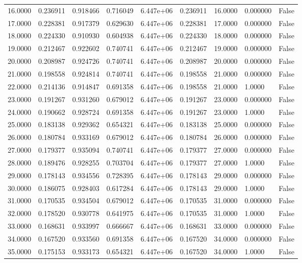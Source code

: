 \documentclass[11pt]{report}
\begin{document}
\begin{longtable}{lllllllll}
16.0000 & 0.236911 & 0.918466 & 0.716049 & 6.447e+06 & 0.236911 & 16.0000 & 0.000000 & False \\
17.0000 & 0.228381 & 0.917379 & 0.629630 & 6.447e+06 & 0.228381 & 17.0000 & 0.000000 & False \\
18.0000 & 0.224330 & 0.910930 & 0.604938 & 6.447e+06 & 0.224330 & 18.0000 & 0.000000 & False \\
19.0000 & 0.212467 & 0.922602 & 0.740741 & 6.447e+06 & 0.212467 & 19.0000 & 0.000000 & False \\
20.0000 & 0.208987 & 0.924726 & 0.740741 & 6.447e+06 & 0.208987 & 20.0000 & 0.000000 & False \\
21.0000 & 0.198558 & 0.924814 & 0.740741 & 6.447e+06 & 0.198558 & 21.0000 & 0.000000 & False \\
22.0000 & 0.214136 & 0.914847 & 0.691358 & 6.447e+06 & 0.198558 & 21.0000 & 1.0000 & False \\
23.0000 & 0.191267 & 0.931260 & 0.679012 & 6.447e+06 & 0.191267 & 23.0000 & 0.000000 & False \\
24.0000 & 0.190662 & 0.928724 & 0.691358 & 6.447e+06 & 0.191267 & 23.0000 & 1.0000 & False \\
25.0000 & 0.183138 & 0.929362 & 0.654321 & 6.447e+06 & 0.183138 & 25.0000 & 0.000000 & False \\
26.0000 & 0.180784 & 0.933169 & 0.679012 & 6.447e+06 & 0.180784 & 26.0000 & 0.000000 & False \\
27.0000 & 0.179377 & 0.935094 & 0.740741 & 6.447e+06 & 0.179377 & 27.0000 & 0.000000 & False \\
28.0000 & 0.189476 & 0.928255 & 0.703704 & 6.447e+06 & 0.179377 & 27.0000 & 1.0000 & False \\
29.0000 & 0.178143 & 0.934556 & 0.728395 & 6.447e+06 & 0.178143 & 29.0000 & 0.000000 & False \\
30.0000 & 0.186075 & 0.928403 & 0.617284 & 6.447e+06 & 0.178143 & 29.0000 & 1.0000 & False \\
31.0000 & 0.170535 & 0.934504 & 0.679012 & 6.447e+06 & 0.170535 & 31.0000 & 0.000000 & False \\
32.0000 & 0.178520 & 0.930778 & 0.641975 & 6.447e+06 & 0.170535 & 31.0000 & 1.0000 & False \\
33.0000 & 0.168631 & 0.933997 & 0.666667 & 6.447e+06 & 0.168631 & 33.0000 & 0.000000 & False \\
34.0000 & 0.167520 & 0.933560 & 0.691358 & 6.447e+06 & 0.167520 & 34.0000 & 0.000000 & False \\
35.0000 & 0.175153 & 0.933173 & 0.654321 & 6.447e+06 & 0.167520 & 34.0000 & 1.0000 & False \\

\end{longtable}
\end{document}
